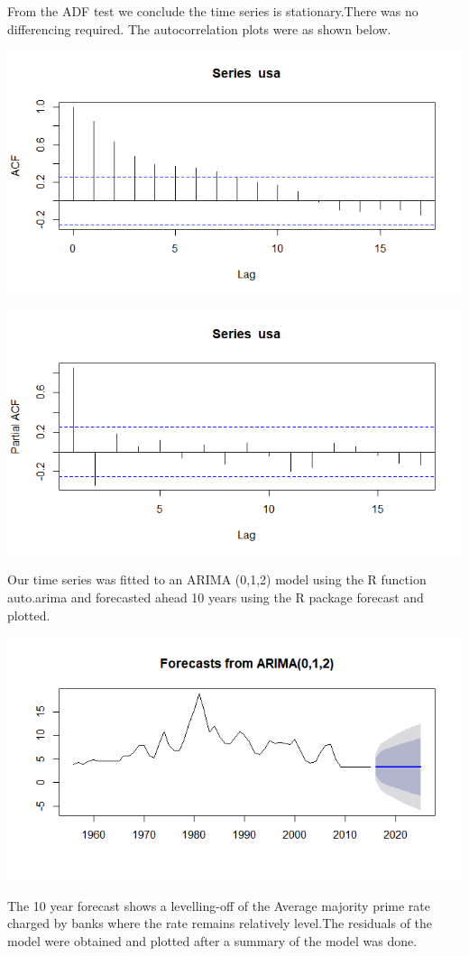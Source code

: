 \documentclass[12pt, a4paper]{report}\usepackage[]{graphicx}\usepackage[]{color}
\begin{document}
From the ADF test we conclude the time series is stationary.There was no differencing required.
The autocorrelation plots were as shown below.
\begin{center}
\includegraphics{rplot04}
\end{center}
\begin{center}
\includegraphics{rplot05}
\end{center}
Our time series was fitted to an ARIMA (0,1,2) model using the R function auto.arima and forecasted ahead 10 years using the R package forecast and plotted.
\begin{center}
\includegraphics{rplot07}
\end{center}
The 10 year forecast shows a levelling-off of the Average majority prime rate charged by banks where the rate remains relatively level.The residuals of the model were obtained and plotted after a summary of the model was done.
\end{document}
